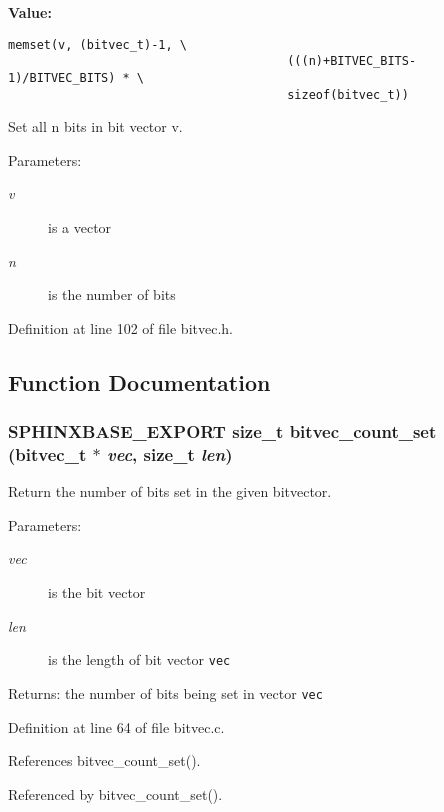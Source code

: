 \textbf{Value:}

\begin{Code}\begin{verbatim}memset(v, (bitvec_t)-1, \
                                       (((n)+BITVEC_BITS-1)/BITVEC_BITS) * \
                                       sizeof(bitvec_t))
\end{verbatim}
\end{Code}
Set all n bits in bit vector v. 

\begin{Desc}
\item[Parameters:]
\begin{description}
\item[{\em v}]is a vector \item[{\em n}]is the number of bits \end{description}
\end{Desc}


Definition at line 102 of file bitvec.h.

\subsection{Function Documentation}
\subsubsection[{bitvec\_\-count\_\-set}]{\setlength{\rightskip}{0pt plus 5cm}SPHINXBASE\_\-EXPORT size\_\-t bitvec\_\-count\_\-set (bitvec\_\-t $\ast$ {\em vec}, \/  size\_\-t {\em len})}\label{bitvec_8h_c8eeaf487cd029e23fffe676f9a77a10}


Return the number of bits set in the given bitvector. 

\begin{Desc}
\item[Parameters:]
\begin{description}
\item[{\em vec}]is the bit vector \item[{\em len}]is the length of bit vector {\tt vec} \end{description}
\end{Desc}
\begin{Desc}
\item[Returns:]the number of bits being set in vector {\tt vec} \end{Desc}


Definition at line 64 of file bitvec.c.

References bitvec\_\-count\_\-set().

Referenced by bitvec\_\-count\_\-set().